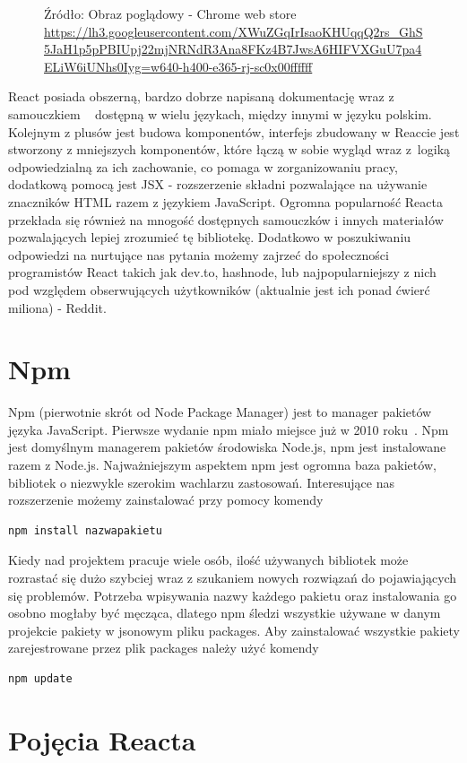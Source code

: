 \documentclass[oneside,polski,logo,indent]{amuthesis}
\begin{document}
{\begin{figure}[H]
{Źródło: Obraz poglądowy - Chrome web store
 \url{https://lh3.googleusercontent.com/XWuZGqIrIsaoKHUqqQ2rs_GhS5JaH1p5pPBIUpj22mjNRNdR3Ana8FKz4B7JwsA6HIFVXGuU7pa4ELiW6iUNhs0Iyg=w640-h400-e365-rj-sc0x00ffffff}
}
\label{react dev example.jpg}
\end{figure}
React posiada obszerną, bardzo dobrze napisaną dokumentację wraz z samouczkiem 
~\cite{reactjs} dostępną w wielu językach, między innymi w języku polskim.
Kolejnym z plusów jest budowa komponentów, interfejs zbudowany w Reaccie jest stworzony z mniejszych komponentów, które łączą w sobie wygląd wraz z~logiką odpowiedzialną za ich zachowanie, co pomaga w zorganizowaniu pracy, dodatkową pomocą jest JSX - rozszerzenie składni pozwalające na używanie znaczników HTML razem z językiem JavaScript.
Ogromna popularność Reacta przekłada się również na mnogość dostępnych samouczków i innych materiałów pozwalających lepiej zrozumieć tę bibliotekę. Dodatkowo w poszukiwaniu odpowiedzi na nurtujące nas pytania możemy zajrzeć do społeczności programistów React takich jak dev.to, hashnode, lub najpopularniejszy z nich pod względem obserwujących użytkowników (aktualnie jest ich ponad ćwierć miliona) - Reddit.
}
\section{Npm}{
Npm (pierwotnie skrót od Node Package Manager) jest to manager pakietów języka JavaScript. Pierwsze wydanie npm miało miejsce już w 2010 roku~\cite{npmwiki}.
Npm jest domyślnym managerem pakietów środowiska Node.js, npm jest instalowane razem z Node.js. Najważniejszym aspektem npm jest ogromna baza pakietów, bibliotek o 
niezwykle szerokim wachlarzu zastosowań. Interesujące nas rozszerzenie możemy zainstalować przy pomocy komendy
\begin{lstlisting}
npm install nazwapakietu
\end{lstlisting}
Kiedy nad projektem pracuje wiele osób, ilość używanych bibliotek może rozrastać się dużo szybciej wraz z szukaniem nowych rozwiązań do pojawiających się problemów.
Potrzeba wpisywania nazwy każdego pakietu oraz instalowania go osobno mogłaby być męcząca, dlatego npm śledzi wszystkie używane w danym projekcie pakiety w jsonowym pliku
packages. Aby zainstalować wszystkie pakiety zarejestrowane przez plik packages należy użyć komendy
\begin{lstlisting}
npm update
\end{lstlisting}
}
\section{Pojęcia Reacta}
\end{document}

